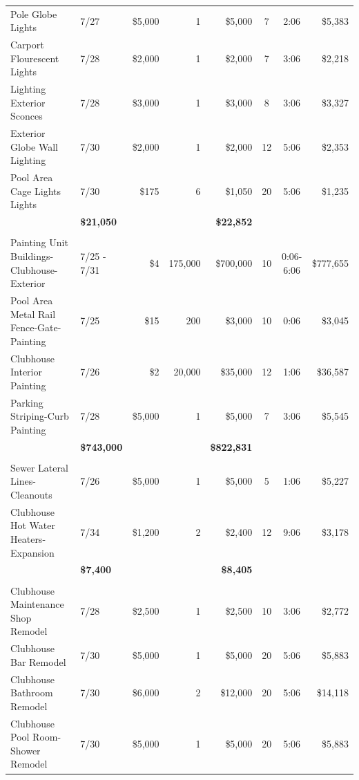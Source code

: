 \documentclass[11pt,letterpaper]{article}
\begin{document}
\begin{longtable}{p{4.2cm} p{1.6cm} r r r c c r}
Pole Globe Lights & 7/27 & \$5,000 & 1 & \$5,000 & 7 & 2:06 & \$5,383 \\
\rowcolor{blue!12} Carport Flourescent Lights & 7/28 & \$2,000 & 1 & \$2,000 & 7 & 3:06 & \$2,218 \\
Lighting Exterior Sconces & 7/28 & \$3,000 & 1 & \$3,000 & 8 & 3:06 & \$3,327 \\
\rowcolor{blue!12} Exterior Globe Wall Lighting & 7/30 & \$2,000 & 1 & \$2,000 & 12 & 5:06 & \$2,353 \\
Pool Area Cage Lights Lights & 7/30 & \$175 & 6 & \$1,050 & 20 & 5:06 & \$1,235 \\
\addlinespace[1pt] \multicolumn{4}{r}{} & \textbf{\$21,050} & & & \textbf{\$22,852} \\
\addlinespace[6pt]
\multicolumn{8}{l}{\textbf{Painting}} \\
\rowcolor{blue!12} Painting Unit Buildings-Clubhouse-Exterior & 7/25 - 7/31 & \$4 & 175,000 & \$700,000 & 10 & 0:06-6:06 & \$777,655 \\
Pool Area Metal Rail Fence-Gate-Painting & 7/25 & \$15 & 200 & \$3,000 & 10 & 0:06 & \$3,045 \\
\rowcolor{blue!12} Clubhouse Interior Painting & 7/26 & \$2 & 20,000 & \$35,000 & 12 & 1:06 & \$36,587 \\
Parking Striping-Curb Painting & 7/28 & \$5,000 & 1 & \$5,000 & 7 & 3:06 & \$5,545 \\
\addlinespace[1pt] \multicolumn{4}{r}{} & \textbf{\$743,000} & & & \textbf{\$822,831} \\
\addlinespace[6pt]
\multicolumn{8}{l}{\textbf{Plumbing}} \\
\rowcolor{blue!12} Sewer Lateral Lines-Cleanouts & 7/26 & \$5,000 & 1 & \$5,000 & 5 & 1:06 & \$5,227 \\
Clubhouse Hot Water Heaters-Expansion & 7/34 & \$1,200 & 2 & \$2,400 & 12 & 9:06 & \$3,178 \\
\addlinespace[1pt] \multicolumn{4}{r}{} & \textbf{\$7,400} & & & \textbf{\$8,405} \\
\addlinespace[6pt]
\multicolumn{8}{l}{\textbf{Renovation}} \\
\rowcolor{blue!12} Clubhouse Maintenance Shop Remodel & 7/28 & \$2,500 & 1 & \$2,500 & 10 & 3:06 & \$2,772 \\
Clubhouse Bar Remodel & 7/30 & \$5,000 & 1 & \$5,000 & 20 & 5:06 & \$5,883 \\
\rowcolor{blue!12} Clubhouse Bathroom Remodel & 7/30 & \$6,000 & 2 & \$12,000 & 20 & 5:06 & \$14,118 \\
Clubhouse Pool Room-Shower Remodel & 7/30 & \$5,000 & 1 & \$5,000 & 20 & 5:06 & \$5,883 \\

\end{longtable}
\end{document}
